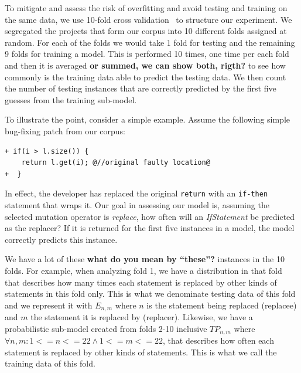 \documentclass[conference]{IEEEtran}
\newcommand{\todo}[1]
  {{\scriptsize \textbf{\color{red} {#1}}}}
\begin{document}
To mitigate and assess the risk of overfitting and avoid testing and training on
the same data, we use 
10-fold cross validation~\cite{kohavi95} to structure our experiment. 
We segregated the projects that form our corpus into 10 
different folds assigned at random. For each of the 
folds we would take 1 fold for testing and the remaining 9 folds for training a model. 
This is performed 10 times, one time per each fold and then it is 
averaged\todo{or summed, we can show both, rigth?} to see how commonly is the training data able to predict the testing 
data.
We then count the number of testing instances that are correctly predicted 
by the first five guesses from the training sub-model.   


To illustrate the point, consider a simple example. Assume the following
simple bug-fixing patch from our corpus: 

\begin{lstlisting}[frame=single,style=base]
+ if(i > l.size()) {
    return l.get(i); @//original faulty location@
+  }    
\end{lstlisting}

In effect, the developer has replaced the original \texttt{return} with an
\texttt{if-then} statement that wraps it.  Our goal in assessing our model is,
assuming the selected mutation operator 
is \emph{replace}, how often will an \emph{IfStatement} be predicted as the
replacer? If it is returned for the first five instances in a model, the model
correctly predicts this instance.  

We have a lot of these\todo{what do you mean by ``these''?} instances in the 10 folds. For example, when analyzing fold 1, we 
have a distribution in that fold that describes how many times each statement is replaced 
by other kinds of statements in this fold 
only. This is what we denominate testing data of this fold and we represent it with $E_{n,m}$ 
where $n$ is the statement being replaced (replacee) and $m$ the statement it is 
replaced by (replacer). Likewise, we have a probabilistic sub-model created from 
folds 2-10 inclusive $TP_{n,m}$ where $\forall n,m: 1<=n<=22 \land 1<=m<=22$, 
that describes how often each statement is replaced by 
other kinds of statements. This is what we call the training data of this fold. 
\end{document}
